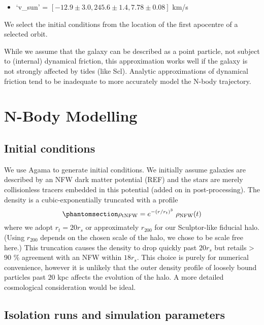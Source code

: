 \begin{itemize}
\tightlist
\item
  `v\_sun' = \([-12.9 \pm 3.0, 245.6 \pm 1.4, 7.78 \pm 0.08]\) km/s
\end{itemize}

We select the initial conditions from the location of the first
apocentre of a selected orbit.

While we assume that the galaxy can be described as a point particle,
not subject to (internal) dynamical friction, this approximation works
well if the galaxy is not strongly affected by tides (like Scl).
Analytic approximations of dynamical friction tend to be inadequate to
more accurately model the N-body trajectory.

\section{N-Body Modelling}\label{n-body-modelling}

\subsection{Initial conditions}\label{initial-conditions}

We use Agama \citep{agama} to generate initial conditions. We initially
assume galaxies are described by an NFW dark matter potential (REF) and
the stars are merely collisionless tracers embedded in this potential
(added on in post-processing). The density is a cubic-exponentially
truncated with a profile
\begin{equation}\protect\phantomsection\label{eq:trunc_nfw}{
\rho_{\rm tNFW} = e^{-(r/r_t)^3}\ \rho_{\rm NFW}(t)
}\end{equation} where we adopt \(r_t = 20 r_s\) or approximately
\(r_{200}\) for our Sculptor-like fiducial halo. (Using \(r_{200}\)
depends on the chosen scale of the halo, we chose to be scale free
here.) This truncation causes the density to drop quickly past
\(20 r_s\) but retails \textgreater{} 90 \(\%\) agreement with an NFW
within \(18r_s\). This choice is purely for numerical convenience,
however it is unlikely that the outer density profile of loosely bound
particles past \(20\) kpc affects the evolution of the halo. A more
detailed cosmological consideration would be ideal.

\subsection{Isolation runs and simulation
parameters}\label{isolation-runs-and-simulation-parameters}

